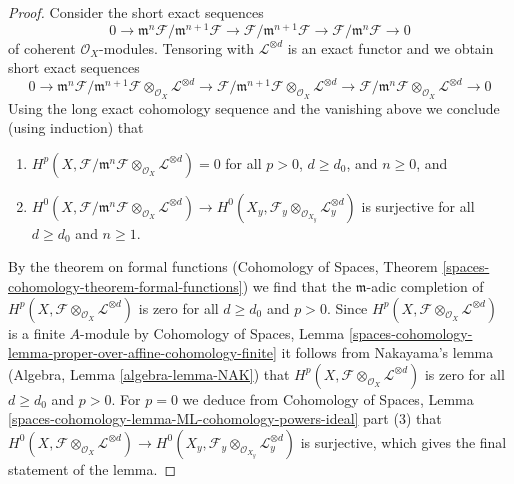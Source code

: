 \begin{proof}
\medskip\noindent
Consider the short exact sequences
$$
0 \to \mathfrak m^n\mathcal{F}/\mathfrak m^{n + 1} \mathcal{F}
\to \mathcal{F}/\mathfrak m^{n + 1} \mathcal{F}
\to \mathcal{F}/\mathfrak m^n \mathcal{F} \to 0
$$
of coherent $\mathcal{O}_X$-modules. Tensoring with $\mathcal{L}^{\otimes d}$
is an exact functor and we obtain short exact sequences
$$
0 \to
\mathfrak m^n\mathcal{F}/\mathfrak m^{n + 1} \mathcal{F}
\otimes_{\mathcal{O}_X} \mathcal{L}^{\otimes d}
\to \mathcal{F}/\mathfrak m^{n + 1} \mathcal{F}
\otimes_{\mathcal{O}_X} \mathcal{L}^{\otimes d}
\to \mathcal{F}/\mathfrak m^n \mathcal{F}
\otimes_{\mathcal{O}_X} \mathcal{L}^{\otimes d} \to 0
$$
Using the long exact cohomology sequence and the vanishing above
we conclude (using induction) that
\begin{enumerate}
\item $H^p(X, \mathcal{F}/\mathfrak m^n \mathcal{F}
\otimes_{\mathcal{O}_X} \mathcal{L}^{\otimes d}) = 0$
for all $p > 0$, $d \geq d_0$, and $n \geq 0$, and
\item $H^0(X, \mathcal{F}/\mathfrak m^n \mathcal{F}
\otimes_{\mathcal{O}_X} \mathcal{L}^{\otimes d}) \to
H^0(X_y, \mathcal{F}_y \otimes_{\mathcal{O}_{X_y}} \mathcal{L}_y^{\otimes d})$
is surjective for all $d \geq d_0$ and $n \geq 1$.
\end{enumerate}
By the theorem on formal functions
(Cohomology of Spaces, Theorem
\ref{spaces-cohomology-theorem-formal-functions})
we find that the $\mathfrak m$-adic completion of
$H^p(X, \mathcal{F} \otimes_{\mathcal{O}_X} \mathcal{L}^{\otimes d})$
is zero for all $d \geq d_0$ and $p > 0$.
Since $H^p(X, \mathcal{F} \otimes_{\mathcal{O}_X} \mathcal{L}^{\otimes d})$
is a finite $A$-module by
Cohomology of Spaces, Lemma
\ref{spaces-cohomology-lemma-proper-over-affine-cohomology-finite}
it follows from Nakayama's lemma (Algebra, Lemma \ref{algebra-lemma-NAK})
that $H^p(X, \mathcal{F} \otimes_{\mathcal{O}_X} \mathcal{L}^{\otimes d})$
is zero for all $d \geq d_0$ and $p > 0$.
For $p = 0$ we deduce from
Cohomology of Spaces, Lemma
\ref{spaces-cohomology-lemma-ML-cohomology-powers-ideal} part (3)
that $H^0(X, \mathcal{F} \otimes_{\mathcal{O}_X} \mathcal{L}^{\otimes d}) \to
H^0(X_y, \mathcal{F}_y \otimes_{\mathcal{O}_{X_y}} \mathcal{L}_y^{\otimes d})$
is surjective, which gives the final statement of the lemma.
\end{proof}

